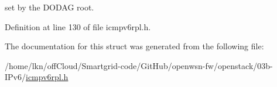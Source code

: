 set by the D\+O\+D\+AG root. 



Definition at line 130 of file icmpv6rpl.\+h.



The documentation for this struct was generated from the following file\+:\begin{DoxyCompactItemize}
\item 
/home/lkn/off\+Cloud/\+Smartgrid-\/code/\+Git\+Hub/openwsn-\/fw/openstack/03b-\/\+I\+Pv6/\hyperlink{icmpv6rpl_8h}{icmpv6rpl.\+h}\end{DoxyCompactItemize}
